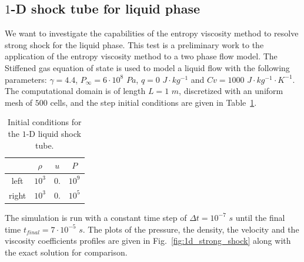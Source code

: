 \documentclass[preprint,10pt]{elsarticle}
\newcommand{\fig}[1]{Fig.~\ref{#1}}                      %
\newcommand{\tbl}[1]{Table~\ref{#1}}                     %
\begin{document}
\subsection{$1$-D shock tube for liquid phase} \label{sec:liquid_shock}
We want to investigate the capabilities of the entropy viscosity method to resolve strong shock for the liquid phase. This test is a preliminary work to the application of the entropy viscosity method to a two phase flow model. The Stiffened gas equation of state is used to model a liquid flow with the following parameters: $\gamma = 4.4$, $P_\infty = 6 \cdot 10^8$ $Pa$, $q = 0$ $J \cdot kg^{-1}$ and $Cv = 1000$ $J \cdot kg^{-1} \cdot K^{-1}$. The computational domain is of length $L=1$ $m$, discretized with an uniform mesh of $500$ cells, and the step initial conditions are given in \tbl{tbl:ic_strong_shock}.
\begin{table}[H]
\begin{center}
 \caption{\label{tbl:ic_strong_shock} Initial conditions for the $1$-D liquid shock tube.}
 \begin{tabular}{|c|c|c|c|}
 \hline
   & $\rho$ & $u$ & $P$ \\
 \hline
left & $10^{3}$ & $0.$ & $10^9$ \\
  \hline
  right & $10^{3}$ & $0.$ & $10^5$ \\
  \hline
\end{tabular}
\end{center}
\end{table}
The simulation is run with a constant time step of $\Delta t = 10^{-7}$ $s$ until the final time $t_{final} = 7 \cdot 10^{-5}$ $s$. The plots of the pressure, the density, the velocity and the viscosity coefficients profiles are given in \fig{fig:1d_strong_shock} along with the exact solution for comparison.
\end{document}
